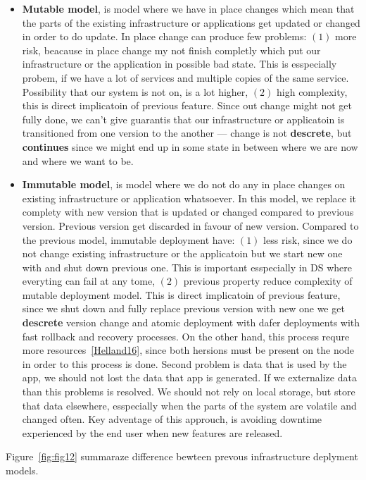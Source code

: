 \begin{itemize}
	\item \textbf{Mutable model}, is model where we have in place changes which mean that the parts of the existing infrastructure or applications get updated or changed in order to do update. In place change can produce few problems: $(1)$ more risk, beacause in place change my not finish completly which put our infrastructure or the application in possible bad state. This is esspecially probem, if we have a lot of services and multiple copies of the same service. Possibility that our system is not on, is a lot higher, $(2)$ high complexity, this is direct implicatoin of previous feature. Since out change might not get fully done, we can't give guarantis that our infrastructure or applicatoin is transitioned from one version to the another --- change is not \textbf{descrete}, but \textbf{continues} since we might end up in some state in between where we are now and where we want to be.
	\item \textbf{Immutable model}, is model where we do not do any in place changes on existing infrastructure or application whatsoever. In this model, we replace it complety with new version that is updated or changed compared to previous version. Previous version get discarded in favour of new version. Compared to the previous model, immutable deployment have: $(1)$ less risk, since we do not change existing infrastructure or the applicatoin but we start new one with and shut down previous one. This is important esspecially in DS where everyting can fail at any tome, $(2)$ previous property reduce complexity of mutable deployment model. This is direct implicatoin of previous feature, since we shut down and fully replace previous version with new one we get \textbf{descrete} version change and atomic deployment with dafer deployments with fast rollback and recovery processes. On the other hand, this process requre more resources~\ref{Helland16}, since both hersions must be present on the node in order to this process is done. Second problem is data that is used by the app, we should not lost the data that app is generated. If we externalize data than this problems is resolved. We should not rely on local storage, but store that data elsewhere, esspecially when the parts of the system are volatile and changed often. Key adventage of this approuch, is avoiding downtime experienced by the end user when new features are released.
\end{itemize}

Figure~\ref{fig:fig12} summaraze difference bewteen prevous infrastructure deplyment models.

